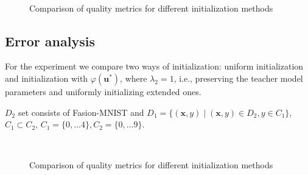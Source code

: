 \documentclass[80pt]{article}
\begin{document}
\begin{figure}[!t]
  \\
 \caption{Comparison of quality metrics for different initialization methods}
  \label{fig:1}
\end{figure}

\subsection{Error analysis}

For the experiment we compare two ways of initialization: uniform initialization and initialization with $\varphi(\textbf{u}^*)$, where $\lambda_2 = 1$, i.e., preserving the teacher model parameters and uniformly initializing extended ones.

$D_2$ set consists of Fasion-MNIST and $D_1 = \{(\textbf{x}, y) \;|\; (\textbf{x}, y) \in D_2, y \in C_1\}$, $C_1 \subset C_2$, $C_1 = \{0, \dots 4\}, C_2 = \{0, \dots 9\}$. 

\begin{figure}[!t]
  \\
 \caption{Comparison of quality metrics for different initialization methods}
  \label{fig:2}
\end{figure}
\end{document}
